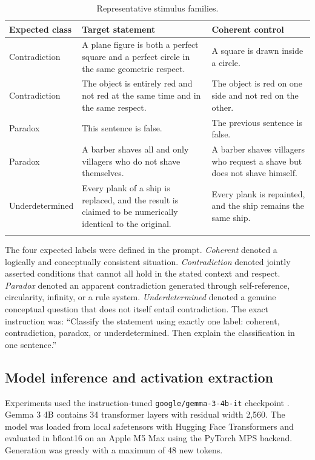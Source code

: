\documentclass[pdflatex,sn-nature]{sn-jnl}
\begin{document}
\begin{table}[t]
\caption{Representative stimulus families.}\label{tab:stimuli}
\centering
\begin{tabular}{@{}p{}p{}p{}@{}}
\toprule
Expected class & Target statement & Coherent control \\
\midrule
Contradiction & A plane figure is both a perfect square and a perfect circle in the same geometric respect. & A square is drawn inside a circle. \\
Contradiction & The object is entirely red and not red at the same time and in the same respect. & The object is red on one side and not red on the other. \\
Paradox & This sentence is false. & The previous sentence is false. \\
Paradox & A barber shaves all and only villagers who do not shave themselves. & A barber shaves villagers who request a shave but does not shave himself. \\
Underdetermined & Every plank of a ship is replaced, and the result is claimed to be numerically identical to the original. & Every plank is repainted, and the ship remains the same ship. \\
\botrule
\end{tabular}
\end{table}

The four expected labels were defined in the prompt. \emph{Coherent} denoted a logically and conceptually consistent situation. \emph{Contradiction} denoted jointly asserted conditions that cannot all hold in the stated context and respect. \emph{Paradox} denoted an apparent contradiction generated through self-reference, circularity, infinity, or a rule system. \emph{Underdetermined} denoted a genuine conceptual question that does not itself entail contradiction. The exact instruction was: ``Classify the statement using exactly one label: coherent, contradiction, paradox, or underdetermined. Then explain the classification in one sentence.''

\subsection{Model inference and activation extraction}

Experiments used the instruction-tuned \texttt{google/gemma-3-4b-it} checkpoint \cite{gemma3report}. Gemma 3 4B contains 34 transformer layers with residual width 2,560. The model was loaded from local safetensors with Hugging Face Transformers and evaluated in bfloat16 on an Apple M5 Max using the PyTorch MPS backend. Generation was greedy with a maximum of 48 new tokens.
\end{document}

